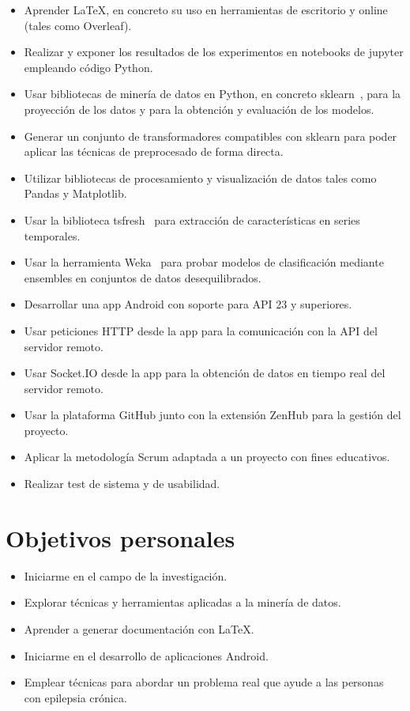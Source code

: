 \begin{itemize}
	\item Aprender \LaTeX{}, en concreto su uso en herramientas de escritorio y online (tales como Overleaf).  
	\item Realizar y exponer los resultados de los experimentos en notebooks de jupyter empleando código Python. 
	\item Usar bibliotecas de minería de datos en Python, en concreto sklearn~\cite{scikit-learn}, para la proyección de los datos y para la obtención y evaluación de los modelos.
	\item Generar un conjunto de transformadores compatibles con sklearn para poder aplicar las técnicas de preprocesado de forma directa.
	\item Utilizar bibliotecas de procesamiento y visualización de datos tales como Pandas y Matplotlib.  
	\item Usar la biblioteca tsfresh~\cite{christ2018time} para extracción de características en series temporales. 
	\item Usar la herramienta Weka~\cite{hall2009weka} para probar modelos de clasificación mediante ensembles en conjuntos de datos desequilibrados. 
	\item Desarrollar una app Android con soporte para API 23 y superiores. 
	\item Usar peticiones HTTP desde la app para la comunicación con la API del servidor remoto. 
	\item Usar Socket.IO desde la app para la obtención de datos en tiempo real del servidor remoto.
	\item Usar la plataforma GitHub junto con la extensión ZenHub para la gestión del proyecto. 
	\item Aplicar la metodología Scrum adaptada a un proyecto con fines educativos. 
	\item Realizar test de sistema y de usabilidad. 
	
	
\end{itemize}

\section{Objetivos personales}

\begin{itemize}
	\item Iniciarme en el campo de la investigación. 
	\item Explorar técnicas y herramientas aplicadas a la minería de datos. 
	\item Aprender a generar documentación con \LaTeX{}. 
	\item Iniciarme en el desarrollo de aplicaciones Android.
	\item Emplear técnicas para abordar un problema real que ayude a las personas con epilepsia crónica.  
\end{itemize}

